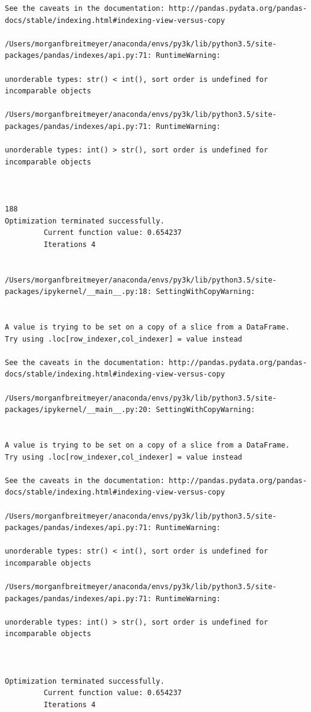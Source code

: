 \begin{lstlisting}
See the caveats in the documentation: http://pandas.pydata.org/pandas-docs/stable/indexing.html#indexing-view-versus-copy

/Users/morganfbreitmeyer/anaconda/envs/py3k/lib/python3.5/site-packages/pandas/indexes/api.py:71: RuntimeWarning:

unorderable types: str() < int(), sort order is undefined for incomparable objects

/Users/morganfbreitmeyer/anaconda/envs/py3k/lib/python3.5/site-packages/pandas/indexes/api.py:71: RuntimeWarning:

unorderable types: int() > str(), sort order is undefined for incomparable objects



188
Optimization terminated successfully.
         Current function value: 0.654237
         Iterations 4


/Users/morganfbreitmeyer/anaconda/envs/py3k/lib/python3.5/site-packages/ipykernel/__main__.py:18: SettingWithCopyWarning:


A value is trying to be set on a copy of a slice from a DataFrame.
Try using .loc[row_indexer,col_indexer] = value instead

See the caveats in the documentation: http://pandas.pydata.org/pandas-docs/stable/indexing.html#indexing-view-versus-copy

/Users/morganfbreitmeyer/anaconda/envs/py3k/lib/python3.5/site-packages/ipykernel/__main__.py:20: SettingWithCopyWarning:


A value is trying to be set on a copy of a slice from a DataFrame.
Try using .loc[row_indexer,col_indexer] = value instead

See the caveats in the documentation: http://pandas.pydata.org/pandas-docs/stable/indexing.html#indexing-view-versus-copy

/Users/morganfbreitmeyer/anaconda/envs/py3k/lib/python3.5/site-packages/pandas/indexes/api.py:71: RuntimeWarning:

unorderable types: str() < int(), sort order is undefined for incomparable objects

/Users/morganfbreitmeyer/anaconda/envs/py3k/lib/python3.5/site-packages/pandas/indexes/api.py:71: RuntimeWarning:

unorderable types: int() > str(), sort order is undefined for incomparable objects



Optimization terminated successfully.
         Current function value: 0.654237
         Iterations 4



\end{lstlisting}
